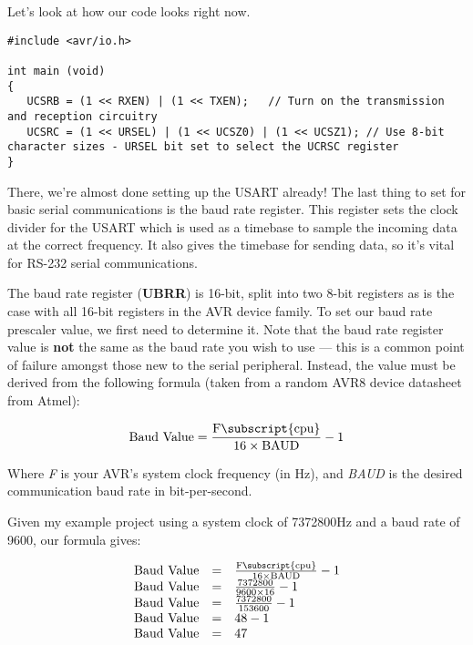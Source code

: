 \documentclass[a4paper,oneside,notitlepage]{book}
\begin{document}
Let's look at how our code looks right now.

\begin{center}
\begin{lstlisting}
#include <avr/io.h>

int main (void)
{
   UCSRB = (1 << RXEN) | (1 << TXEN);   // Turn on the transmission and reception circuitry
   UCSRC = (1 << URSEL) | (1 << UCSZ0) | (1 << UCSZ1); // Use 8-bit character sizes - URSEL bit set to select the UCRSC register
}
\end{lstlisting}
\end{center}

There, we're almost done setting up the USART already! The last thing to set for basic serial communications is the baud rate register. This register sets the clock divider for the USART which is used as a timebase to sample the incoming data at the correct frequency. It also gives the timebase for sending data, so it's vital for RS-232 serial communications.

The baud rate register (\textbf{UBRR}) is 16-bit, split into two 8-bit registers as is the case with all 16-bit registers in the AVR device family. To set our baud rate prescaler value, we first need to determine it. Note that the baud rate register value is \textbf{not} the same as the baud rate you wish to use --- this is a common point of failure amongst those new to the serial peripheral. Instead, the value must be derived from the following formula (taken from a random AVR8 device datasheet from Atmel):

\begin{displaymath}
    \text{Baud Value} = \frac{ \text{F\subscript{cpu}} }{ 16 \times \text{BAUD} } - 1
\end{displaymath}

Where \emph{F} is your AVR's system clock frequency (in Hz), and \emph{BAUD} is the desired communication baud rate in bit-per-second.

Given my example project using a system clock of 7372800Hz and a baud rate of 9600, our formula gives:

\begin{displaymath}
\begin{array}{rcl}
    \text{Baud Value} & = & \frac{ \text{F\subscript{cpu}} }{ 16 \times \text{BAUD} } - 1 \\
    \text{Baud Value} & = & \frac{ 7372800 } { 9600 \times 16 } - 1 \\
    \text{Baud Value} & = & \frac{ 7372800 } { 153600 } - 1 \\
    \text{Baud Value} & = & 48 - 1 \\
    \text{Baud Value} & = & 47 \\
\end{array}
\end{displaymath}
\end{document}
